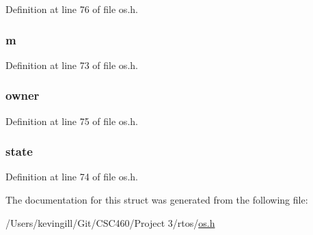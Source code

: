 Definition at line 76 of file os.\+h.

\subsubsection[{\texorpdfstring{m}{m}}]{ m}\hypertarget{struct_mutex_a83f1cf80c5086c88b4faec56356500d8}{}\label{struct_mutex_a83f1cf80c5086c88b4faec56356500d8}


Definition at line 73 of file os.\+h.

\subsubsection[{\texorpdfstring{owner}{owner}}]{ owner}\hypertarget{struct_mutex_a90934363cb9928058e05ccf79e6019a7}{}\label{struct_mutex_a90934363cb9928058e05ccf79e6019a7}


Definition at line 75 of file os.\+h.

\subsubsection[{\texorpdfstring{state}{state}}]{ state}\hypertarget{struct_mutex_a4c56d800948d078e891a4e1f0da9ce67}{}\label{struct_mutex_a4c56d800948d078e891a4e1f0da9ce67}


Definition at line 74 of file os.\+h.



The documentation for this struct was generated from the following file\+:\begin{DoxyCompactItemize}
\item 
/\+Users/kevingill/\+Git/\+C\+S\+C460/\+Project 3/rtos/\hyperlink{os_8h}{os.\+h}\end{DoxyCompactItemize}

